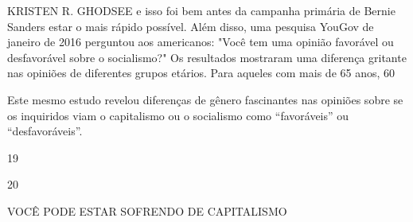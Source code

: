  \par 
KRISTEN R. GHODSEE e isso foi bem antes da campanha primária de Bernie Sanders estar o mais rápido possível. Além disso, uma pesquisa YouGov de janeiro de 2016 perguntou aos americanos: "Você tem uma opinião favorável ou desfavorável sobre o socialismo?" Os resultados mostraram uma diferença gritante nas opiniões de diferentes grupos etários. Para aqueles com mais de {\color{blue}65} anos, 60%
 \par 
Este mesmo estudo revelou diferenças de gênero fascinantes nas opiniões sobre se os inquiridos viam o capitalismo ou o socialismo como “favoráveis” ou “desfavoráveis”.
 \par 
19
 \par 
20
 \par 
VOCÊ PODE ESTAR SOFRENDO DE CAPITALISMO
 \par 
